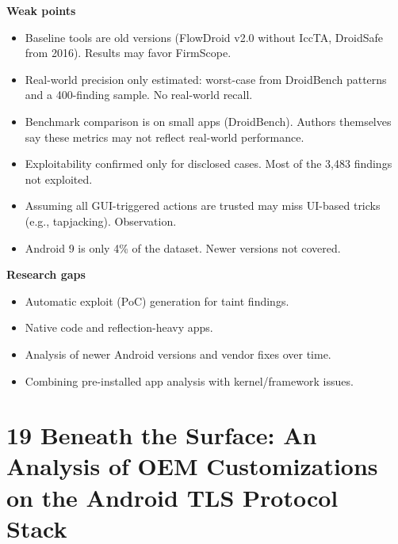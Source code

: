 \documentclass[11pt,a4paper]{article}
\begin{document}
\begin{enumerate}
    \vspace{4pt}
    \textbf{Weak points}
    \begin{itemize}
        \item Baseline tools are old versions (FlowDroid v2.0 without IccTA, DroidSafe from 2016). Results may favor FirmScope.
        \item Real-world precision only estimated: worst-case from DroidBench patterns and a 400-finding sample. No real-world recall.
        \item Benchmark comparison is on small apps (DroidBench). Authors themselves say these metrics may not reflect real-world performance.
        \item Exploitability confirmed only for disclosed cases. Most of the 3,483 findings not exploited.
        \item Assuming all GUI-triggered actions are trusted may miss UI-based tricks (e.g., tapjacking). Observation.
        \item Android 9 is only 4\% of the dataset. Newer versions not covered.
    \end{itemize}

    \vspace{4pt}
    \textbf{Research gaps}
    \begin{itemize}
        \item Automatic exploit (PoC) generation for taint findings.
        \item Native code and reflection-heavy apps.
        \item Analysis of newer Android versions and vendor fixes over time.
        \item Combining pre-installed app analysis with kernel/framework issues.
    \end{itemize}

\end{enumerate}

\newpage

\section{19 Beneath the Surface: An Analysis of OEM Customizations on the Android TLS Protocol Stack}
\end{document}
